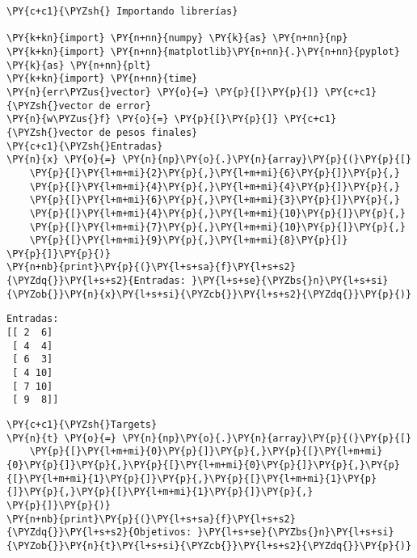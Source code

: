 \begin{tcolorbox}[breakable, size=fbox, boxrule=1pt, pad at break*=1mm,colback=cellbackground, colframe=cellborder]
\begin{Verbatim}[commandchars=\\\{\}]
\PY{c+c1}{\PYZsh{} Importando librerías}

\PY{k+kn}{import} \PY{n+nn}{numpy} \PY{k}{as} \PY{n+nn}{np}
\PY{k+kn}{import} \PY{n+nn}{matplotlib}\PY{n+nn}{.}\PY{n+nn}{pyplot} \PY{k}{as} \PY{n+nn}{plt}
\PY{k+kn}{import} \PY{n+nn}{time}
\PY{n}{err\PYZus{}vector} \PY{o}{=} \PY{p}{[}\PY{p}{]} \PY{c+c1}{\PYZsh{}vector de error}
\PY{n}{w\PYZus{}f} \PY{o}{=} \PY{p}{[}\PY{p}{]} \PY{c+c1}{\PYZsh{}vector de pesos finales}
\PY{c+c1}{\PYZsh{}Entradas}
\PY{n}{x} \PY{o}{=} \PY{n}{np}\PY{o}{.}\PY{n}{array}\PY{p}{(}\PY{p}{[}
    \PY{p}{[}\PY{l+m+mi}{2}\PY{p}{,}\PY{l+m+mi}{6}\PY{p}{]}\PY{p}{,}
    \PY{p}{[}\PY{l+m+mi}{4}\PY{p}{,}\PY{l+m+mi}{4}\PY{p}{]}\PY{p}{,}
    \PY{p}{[}\PY{l+m+mi}{6}\PY{p}{,}\PY{l+m+mi}{3}\PY{p}{]}\PY{p}{,}
    \PY{p}{[}\PY{l+m+mi}{4}\PY{p}{,}\PY{l+m+mi}{10}\PY{p}{]}\PY{p}{,}
    \PY{p}{[}\PY{l+m+mi}{7}\PY{p}{,}\PY{l+m+mi}{10}\PY{p}{]}\PY{p}{,}
    \PY{p}{[}\PY{l+m+mi}{9}\PY{p}{,}\PY{l+m+mi}{8}\PY{p}{]}
\PY{p}{]}\PY{p}{)}
\PY{n+nb}{print}\PY{p}{(}\PY{l+s+sa}{f}\PY{l+s+s2}{\PYZdq{}}\PY{l+s+s2}{Entradas: }\PY{l+s+se}{\PYZbs{}n}\PY{l+s+si}{\PYZob{}}\PY{n}{x}\PY{l+s+si}{\PYZcb{}}\PY{l+s+s2}{\PYZdq{}}\PY{p}{)}
\end{Verbatim}
\end{tcolorbox}

    \begin{Verbatim}[commandchars=\\\{\}]
Entradas:
[[ 2  6]
 [ 4  4]
 [ 6  3]
 [ 4 10]
 [ 7 10]
 [ 9  8]]
    \end{Verbatim}

    \begin{tcolorbox}[breakable, size=fbox, boxrule=1pt, pad at break*=1mm,colback=cellbackground, colframe=cellborder]
\begin{Verbatim}[commandchars=\\\{\}]
\PY{c+c1}{\PYZsh{}Targets}
\PY{n}{t} \PY{o}{=} \PY{n}{np}\PY{o}{.}\PY{n}{array}\PY{p}{(}\PY{p}{[}
    \PY{p}{[}\PY{l+m+mi}{0}\PY{p}{]}\PY{p}{,}\PY{p}{[}\PY{l+m+mi}{0}\PY{p}{]}\PY{p}{,}\PY{p}{[}\PY{l+m+mi}{0}\PY{p}{]}\PY{p}{,}\PY{p}{[}\PY{l+m+mi}{1}\PY{p}{]}\PY{p}{,}\PY{p}{[}\PY{l+m+mi}{1}\PY{p}{]}\PY{p}{,}\PY{p}{[}\PY{l+m+mi}{1}\PY{p}{]}\PY{p}{,}
\PY{p}{]}\PY{p}{)}
\PY{n+nb}{print}\PY{p}{(}\PY{l+s+sa}{f}\PY{l+s+s2}{\PYZdq{}}\PY{l+s+s2}{Objetivos: }\PY{l+s+se}{\PYZbs{}n}\PY{l+s+si}{\PYZob{}}\PY{n}{t}\PY{l+s+si}{\PYZcb{}}\PY{l+s+s2}{\PYZdq{}}\PY{p}{)}
\end{Verbatim}
\end{tcolorbox}

